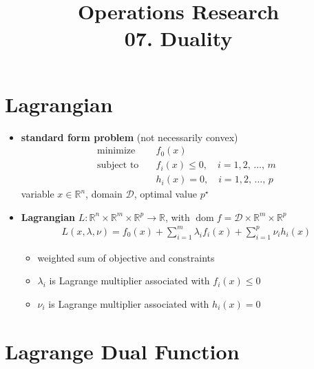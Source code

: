 \documentclass[11pt]{extarticle}
\newcommand{\ds}{\displaystyle}
\DeclareMathOperator*{\dom}{dom}
\theoremstyle{definition}
\begin{document}
\title{\texorpdfstring{\vspace{15mm} Operations Research\\ 07. Duality}{Operations Research\\ 07. Duality}} 
\author{}
\date{}
\maketitle
\newpage

\section*{Lagrangian}

\begin{itemize}
  \item {\bf standard form problem} (not necessarily convex)
    \begin{align*}
      \text{minimize}\quad &f_0(x) \\
      \text{subject to}\quad &f_i(x)\leqslant 0, \quad i = 1, 2,\,\ldots,\,m \\
      \qquad\qquad &h_i(x) = 0, \quad i = 1, 2,\,\ldots,\,p 
    \end{align*}
    variable $x\in\mathbb{R}^n$, domain $\mathcal{D}$, optimal value $p^\star$
  \item {\bf Lagrangian} $L:\mathbb{R}^n\times\mathbb{R}^m\times\mathbb{R}^p\to\mathbb{R}$, with $\dom f = \mathcal{D}\times\mathbb{R}^m\times\mathbb{R}^p$
    \begin{align*}
      L(x,\lambda,\nu) = f_0(x) + \sum_{i=1}^m\lambda_i f_i(x) + \sum_{i=1}^p\nu_i h_i(x)
    \end{align*}
    \begin{itemize}
      \item weighted sum of objective and constraints 
      \item $\lambda_i$ is Lagrange multiplier associated with $\ds f_i(x)\leqslant 0$
      \item $\nu_i$ is Lagrange multiplier associated with $\ds h_i(x) = 0$
    \end{itemize}
\end{itemize}

\newpage

\section*{Lagrange Dual Function}
\end{document}
